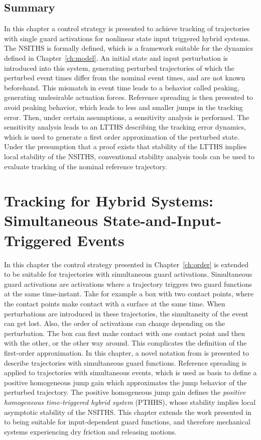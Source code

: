 \documentclass[../DC2017114Bouma.tex]{subfiles}
\begin{document}
\section{Summary}
In this chapter a control strategy is presented to achieve tracking of trajectories with single guard activations for nonlinear state input triggered hybrid systems. The NSITHS is formally defined, which is a framework suitable for the dynamics defined in Chapter~\ref{ch:model}. An initial state and input perturbation is introduced into this system, generating perturbed trajectories of which the perturbed event times differ from the nominal event times, and are not known beforehand. This mismatch in event time leads to a behavior called peaking, generating undesirable actuation forces. Reference spreading is then presented to avoid peaking behavior, which leads to less and smaller jumps in the tracking error. Then, under certain assumptions, a sensitivity analysis is performed. The sensitivity analysis leads to an LTTHS describing the tracking error dynamics, which is used to generate a first order approximation of the perturbed state. Under the presumption that a proof exists that stability of the LTTHS implies local stability of the NSITHS, conventional stability analysis tools can be used to evaluate tracking of the nominal reference trajectory.
\cleartooddpage
\chapter{Tracking for Hybrid Systems: Simultaneous State-and-Input-Triggered Events}\label{ch:simult}
In this chapter the control strategy presented in Chapter~\ref{ch:order} is extended to be suitable for trajectories with simultaneous guard activations. Simultaneous guard activations are activations where a trajectory triggers two guard functions at the same time-instant. Take for example a box with two contact points, where the contact points make contact with a surface at the same time. When perturbations are introduced in these trajectories, the simultaneity of the event can get lost. Also, the order of activations can change depending on the perturbation. The box can first make contact with one contact point and then with the other, or the other way around. This complicates the definition of the first-order approximation. In this chapter, a novel notation from \cite{Rijnen2018} is presented to describe trajectories with simultaneous guard functions. Reference spreading is applied to trajectories with simultaneous events, which is used as basis to define a positive homogeneous jump gain which approximates the jump behavior of the perturbed trajectory. The positive homogeneous jump gain defines the \textit{positive homogeneous time-triggered hybrid system} (PTHHS), whose stability implies local asymptotic stability of the NSITHS. This chapter extends the work presented in \cite{Rijnen2018} to being suitable for input-dependent guard functions, and therefore mechanical systems experiencing dry friction and releasing motions.
\end{document}
